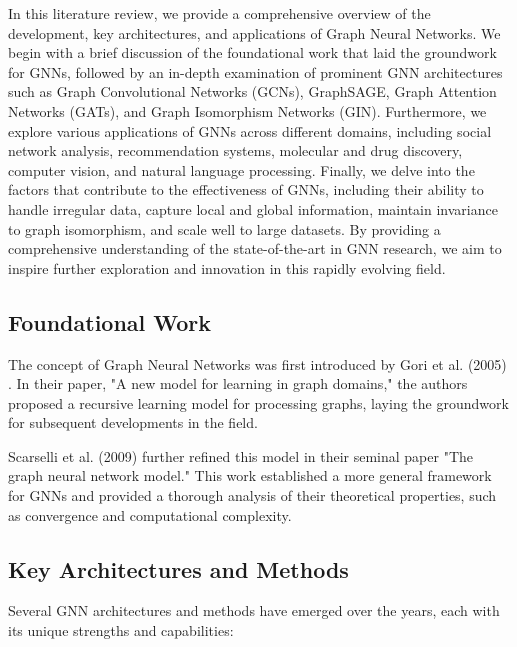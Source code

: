 \documentclass[final]{article}
\begin{document}
In this literature review, we provide a comprehensive overview of the development, key architectures, and applications of Graph Neural Networks. We begin with a brief discussion of the foundational work that laid the groundwork for GNNs, followed by an in-depth examination of prominent GNN architectures such as Graph Convolutional Networks (GCNs), GraphSAGE, Graph Attention Networks (GATs), and Graph Isomorphism Networks (GIN). Furthermore, we explore various applications of GNNs across different domains, including social network analysis, recommendation systems, molecular and drug discovery, computer vision, and natural language processing. Finally, we delve into the factors that contribute to the effectiveness of GNNs, including their ability to handle irregular data, capture local and global information, maintain invariance to graph isomorphism, and scale well to large datasets. By providing a comprehensive understanding of the state-of-the-art in GNN research, we aim to inspire further exploration and innovation in this rapidly evolving field.

\subsection{Foundational Work}

The concept of Graph Neural Networks was first introduced by Gori et al. (2005) \cite{gori2005}. In their paper, "A new model for learning in graph domains," the authors proposed a recursive learning model for processing graphs, laying the groundwork for subsequent developments in the field.

Scarselli et al. (2009) \cite{scarselli2009} further refined this model in their seminal paper "The graph neural network model." This work established a more general framework for GNNs and provided a thorough analysis of their theoretical properties, such as convergence and computational complexity.

\subsection{Key Architectures and Methods}

Several GNN architectures and methods have emerged over the years, each with its unique strengths and capabilities:
\end{document}
